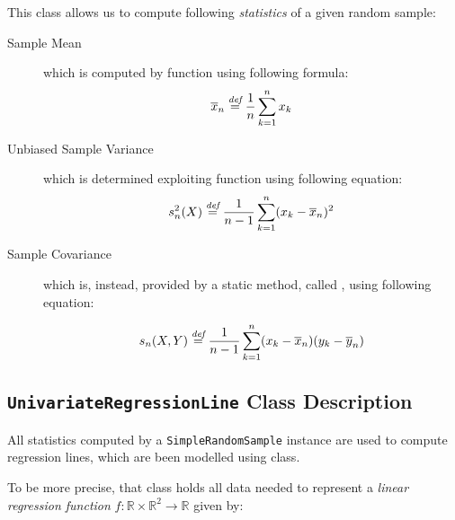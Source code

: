 \documentclass[sigconf]{acmart}
\begin{document}
This class allows us to compute following \textit{statistics} of a given random sample:
\begin{description}

\item[Sample Mean] which is computed by  function using following formula:
\begin{equation}
\overline{x}_n \overset{\textit{def}}{=} \frac{1}{n}\sum_{k=1}^n x_k
\end{equation}

\item[Unbiased Sample Variance] which is determined exploiting  function using following equation:
\begin{equation}
s^2_n(X) \overset{\textit{def}}{=} \frac{1}{n-1}\sum_{k=1}^n (x_k - \overline{x}_n)^2
\end{equation}

\item[Sample Covariance] which is, instead, provided by a static method, called , using following equation:

\begin{equation}
s_n(X,Y) \overset{\textit{def}}{=} \frac{1}{n-1}\sum_{k=1}^n (x_k - \overline{x}_n)(y_k - \overline{y}_n)
\end{equation}

\end{description}

\subsection{\texttt{UnivariateRegressionLine} Class Description}

All statistics computed by a \texttt{SimpleRandomSample} instance are used to compute regression lines, which are been modelled using  class.

To be more precise, that class holds all data needed to represent a \textit{linear regression function} $f : \mathbb{R} \times \mathbb{R}^2 \longrightarrow \mathbb{R}$ given by:
\end{document}

